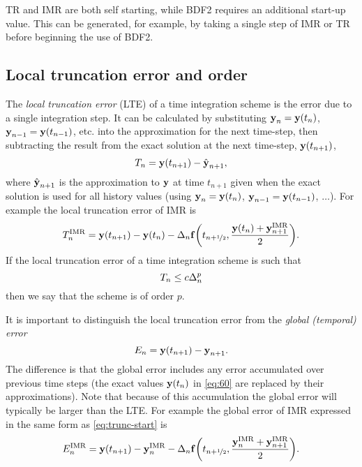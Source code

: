 TR and IMR are both self starting, while BDF2 requires an additional start-up value.
This can be generated, for example, by taking a single step of IMR or TR before beginning the use of BDF2.


\subsection{Local truncation error and order}
\label{sec:deriv-local-trunc}

The \emph{local truncation error} (LTE) of a time integration scheme is the error due to a single integration step.
It can be calculated by substituting $\boldsymbol{\mathrm{y}}_n = \boldsymbol{\mathrm{y}}(t_n)$, $\boldsymbol{\mathrm{y}}_{n-1} = \boldsymbol{\mathrm{y}}(t_{n-1})$, etc. into the approximation for the next time-step, then subtracting the result from the exact solution at the next time-step, $\boldsymbol{\mathrm{y}}(t_{n+1})$, \ie
\begin{equation}
  \label{eq:60}
  T_n = \boldsymbol{\mathrm{y}}(t_{n+1}) - \hat{\boldsymbol{\mathrm{y}}}_{n+1},
\end{equation}
where $\hat{\boldsymbol{\mathrm{y}}}_{n+1}$ is the approximation to $\boldsymbol{\mathrm{y}}$ at time $t_{n+1}$ given when the exact solution is used for all history values (\ie using $\boldsymbol{\mathrm{y}}_{n} = \boldsymbol{\mathrm{y}}(t_n)$, $\boldsymbol{\mathrm{y}}_{n-1} = \boldsymbol{\mathrm{y}}(t_{n-1})$, $\ldots$).
For example the local truncation error of IMR is
\begin{equation}
  T_n^{\mathrm{IMR}} =  \boldsymbol{\mathrm{y}}(t_{n+1}) - \boldsymbol{\mathrm{y}}(t_n) - \Delta_{n} {\boldsymbol{\mathrm{f}}{\left( t_{n+\nicefrac{1}{2}}, \frac{\boldsymbol{\mathrm{y}}(t_n) + \boldsymbol{\mathrm{y}}_{n+1}^{\mathrm{IMR}}}{2} \right)}}.
  \label{eq:trunc-start}
\end{equation}
If the local truncation error of a time integration scheme is such that
\begin{equation}
  T_n \leq c \Delta_{n}^p
\end{equation}
then we say that the scheme is of order $p$.

It is important to distinguish the local truncation error from the \emph{global (temporal) error}
\begin{equation}
  \label{eq:global-temporal-error}
    E_n = \boldsymbol{\mathrm{y}}(t_{n+1}) - \boldsymbol{\mathrm{y}}_{n+1}.
\end{equation}
The difference is that the global error includes any error accumulated over previous time steps (\ie the exact values $\boldsymbol{\mathrm{y}}(t_n)$ in \cref{eq:60} are replaced by their approximations).
Note that because of this accumulation the global error will typically be larger than the LTE.
For example the global error of IMR expressed in the same form as \cref{eq:trunc-start} is
\begin{equation}
  E_n^{\mathrm{IMR}} =  \boldsymbol{\mathrm{y}}(t_{n+1}) - \boldsymbol{\mathrm{y}}_n^{\mathrm{IMR}} - \Delta_{n} {\boldsymbol{\mathrm{f}}{\left(  t_{n+\nicefrac{1}{2}}, \frac{\boldsymbol{\mathrm{y}}_n^{\mathrm{IMR}} + \boldsymbol{\mathrm{y}}_{n+1}^{\mathrm{IMR}}}{2}  \right)}}.
\end{equation}

